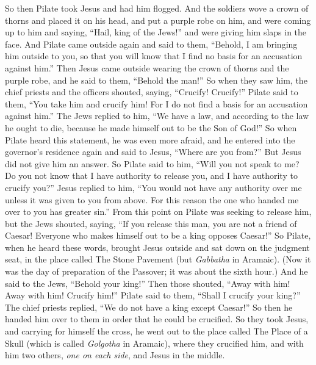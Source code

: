 \begin{biblechapter} %
 So then Pilate took Jesus and had him flogged.
\verse And the soldiers wove a crown of thorns and placed it on his head, and put a purple robe on him,
\verse and were coming up to him and saying, “Hail, king of the Jews!” and were giving him slaps in the face.
\verse And Pilate came outside again and said to them, “Behold, I am bringing him outside to you, so that you will know that I find no basis for an accusation against him.”
\verse Then Jesus came outside wearing the crown of thorns and the purple robe, and he said to them, “Behold the man!”
\verse So when they saw him, the chief priests and the officers shouted, saying, “Crucify! Crucify!” Pilate said to them, “You take him and crucify him! For I do not find a basis for an accusation against him.”
\verse The Jews replied to him, “We have a law, and according to the law he ought to die, because he made himself out to be the Son of God!”
\verse So when Pilate heard this statement, he was even more afraid,
\verse and he entered into the governor’s residence again and said to Jesus, “Where are you from?” But Jesus did not give him an answer.
\verse So Pilate said to him, “Will you not speak to me? Do you not know that I have authority to release you, and I have authority to crucify you?”
\verse Jesus replied to him, “You would not have any authority over me unless it was given to you from above. For this reason the one who handed me over to you has greater sin.”
\verse From this point on Pilate was seeking to release him, but the Jews shouted, saying, “If you release this man, you are not a friend of Caesar! Everyone who makes himself out to be a king opposes Caesar!”
\verse So Pilate, when he heard these words, brought Jesus outside and sat down on the judgment seat, in the place called The Stone Pavement (but \textit{Gabbatha} in Aramaic).
\verse (Now it was the day of preparation of the Passover; it was about the sixth hour.) And he said to the Jews, “Behold your king!”
\verse Then those shouted, “Away with him! Away with him! Crucify him!” Pilate said to them, “Shall I crucify your king?” The chief priests replied, “We do not have a king except Caesar!”
\verse So then he handed him over to them in order that he could be crucified.
 So they took Jesus,
\verse and carrying for himself the cross, he went out to the place called The Place of a Skull (which is called \textit{Golgotha} in Aramaic),
\verse where they crucified him, and with him two others, \textit{one on each side}, and Jesus in the middle.

\end{biblechapter}
